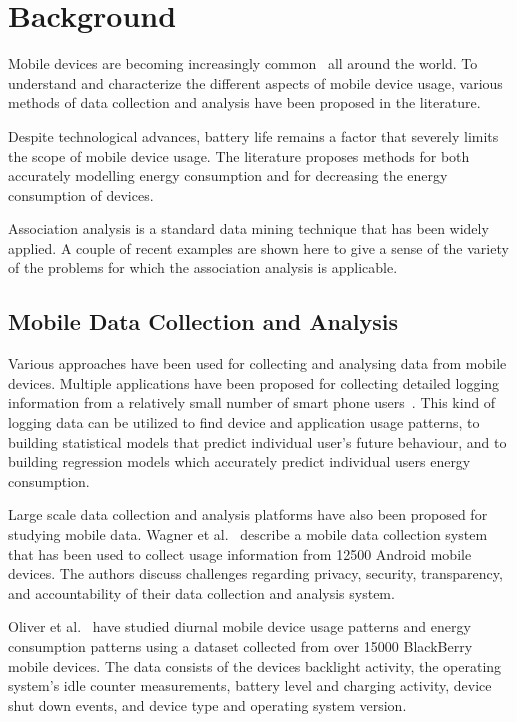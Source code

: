 \section{Background}

Mobile devices are becoming increasingly common~\cite{ITUstats} all around the world. To understand and characterize the different aspects of mobile device usage, various methods of data collection and analysis have been proposed in the literature. 

Despite technological advances, battery life remains a factor that severely limits the scope of mobile device usage. The literature proposes methods for both accurately modelling energy consumption and for decreasing the energy consumption of devices.             

Association analysis is a standard data mining technique that has been widely applied. A couple of recent examples are shown here to give a sense of the variety of the problems for which the association analysis is applicable. 

\subsection{Mobile Data Collection and Analysis}

Various approaches have been used for collecting and analysing data from mobile devices. Multiple applications have been proposed for collecting detailed logging information from a relatively small number of smart phone users~\cite{Ferreira:2014:CES:2628363.2628367, Falaki:2010:DSU:1814433.1814453, 5375354}. This kind of logging data can be utilized to find device and application usage patterns, to building statistical models that predict individual user's future behaviour, and to building regression models which accurately predict individual users energy consumption. 

Large scale data collection and analysis platforms have also been proposed for studying mobile data. Wagner et al.~\cite{Wagner:2014:DAL:2627534.2627553} describe a mobile data collection system that has been used to collect usage information from 12500 Android mobile devices. The authors discuss challenges regarding privacy, security, transparency, and accountability of their data collection and analysis system. 

Oliver et al.~\cite{Oliver:2010:CLS:1834616.1834623, Oliver_datadriven} have studied diurnal mobile device usage patterns and energy consumption patterns using a dataset collected from over 15000 BlackBerry mobile devices. The data consists of the devices backlight activity, the operating system's idle counter measurements, battery level and charging activity, device shut down events, and device type and operating system version.      

